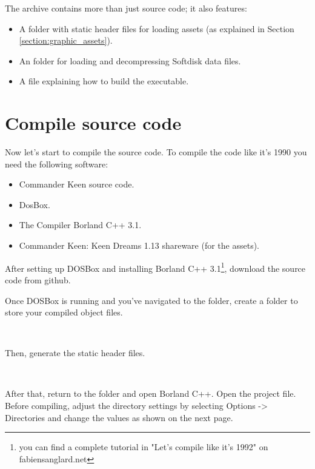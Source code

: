 \documentclass[book.tex]{subfiles}
\begin{document}
 
The archive contains more than just source code; it also features:
\begin{itemize}
\item A  folder with static header files for loading assets (as explained in Section \ref{section:graphic_assets}).
\item An  folder for loading and decompressing Softdisk data files.
\item A  file explaining how to build the executable.
\end{itemize}

\pagebreak
\section{Compile source code}
Now let's start to compile the source code. To compile the code like it's 1990 you need the following software:
\begin{itemize}
\item Commander Keen source code.
\item DosBox.
\item The Compiler Borland C++ 3.1.
\item Commander Keen: Keen Dreams 1.13 shareware (for the assets).
\end{itemize}

\par
After setting up DOSBox and installing Borland C++ 3.1\footnote{you can find a complete tutorial in "Let's compile like it's 1992" on fabiensanglard.net}, download the source code from github.\\

\par
Once DOSBox is running and you've navigated to the  folder, create a folder to store your compiled object files. \\

\par
{}\\
\par
Then, generate the static  header files.\\
\par
{}\\
\par
After that, return to the  folder and open Borland C++. Open the  project file. Before compiling, adjust the directory settings by selecting Options -> Directories and change the values as shown on the next page. \\
\end{document}
